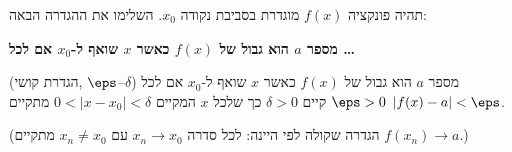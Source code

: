 
\begin{question}
תהיה פונקציה $f(x)$ מוגדרת בסביבת נקודה $x_0$. השלימו את ההגדרה הבאה:

\textbf{מספר $a$ הוא גבול של $f(x)$ כאשר $x$ שואף ל-$x_0$ אם לכל \ldots}
\end{question}

\begin{solution}
(הגדרת קושי, $\eps$--$\delta$) מספר $a$ הוא גבול של $f(x)$ כאשר $x$ שואף ל-$x_0$ אם לכל $\eps>0$ קיים $\delta>0$ כך שלכל $x$ המקיים $0<|x-x_0|<\delta$ מתקיים $|f(x)-a|<\eps$.

(הגדרה שקולה לפי היינה: לכל סדרה $x_n\to x_0$ עם $x_n\neq x_0$ מתקיים $f(x_n)\to a$.)
\end{solution}
